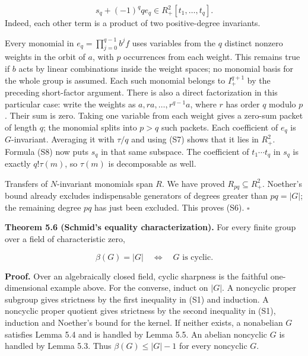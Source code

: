 \documentclass[
]{article}
\begin{document}
\[
s_q+(-1)^q q e_q\in R_+^2 [t_1,\ldots,t_q].
\tag{S8}
\] Indeed, each other term is a product of two positive-degree
invariants.

Every monomial in \(e_q=\prod_{j=0}^{q-1}b^jf\) uses variables from the
\(q\) distinct nonzero weights in the orbit of \(a\), with \(p\)
occurrences from each weight. This remains true if \(b\) acts by linear
combinations inside the weight spaces; no monomial basis for the whole
group is assumed. Each such monomial belongs to \(I_+^{q+1}\) by the
preceding short-factor argument. There is also a direct factorization in
this particular case: write the weights as \(a,ra,\ldots,r^{q-1}a\),
where \(r\) has order \(q\) modulo \(p\). Their sum is zero. Taking one
variable from each weight gives a zero-sum packet of length \(q\); the
monomial splits into \(p>q\) such packets. Each coefficient of \(e_q\)
is \(G\)-invariant. Averaging it with \(\tau/q\) and using (S7) shows
that it lies in \(R_+^2\). Formula (S8) now puts \(s_q\) in that same
subspace. The coefficient of \(t_1\cdots t_q\) in \(s_q\) is exactly
\(q!\tau(m)\), so \(\tau(m)\) is decomposable as well.

Transfers of \(N\)-invariant monomials span \(R\). We have proved
\(R_{pq}\subseteq R_+^2\). Noether's bound already excludes
indispensable generators of degrees greater than \(pq=|G|\); the
remaining degree \(pq\) has just been excluded. This proves (S6).
\(\square\)

\protect{}\label{theorem-5-6}{}

\textbf{Theorem 5.6 (Schmid's equality characterization).} For every
finite group over a field of characteristic zero,
\protect{}\label{equation-S9}{}

\[
\beta(G)=|G|\quad\Longleftrightarrow\quad G\text{ is cyclic}.
\tag{S9}
\]

\textbf{Proof.} Over an algebraically closed field, cyclic sharpness is
the faithful one-dimensional example above. For the converse, induct on
\(|G|\). A noncyclic proper subgroup gives strictness by the first
inequality in (S1) and induction. A noncyclic proper quotient gives
strictness by the second inequality in (S1), induction and Noether's
bound for the kernel. If neither exists, a nonabelian \(G\) satisfies
Lemma 5.4 and is handled by Lemma 5.5. An abelian noncyclic \(G\) is
handled by Lemma 5.3. Thus \(\beta(G)\leq|G|-1\) for every noncyclic
\(G\).
\end{document}
